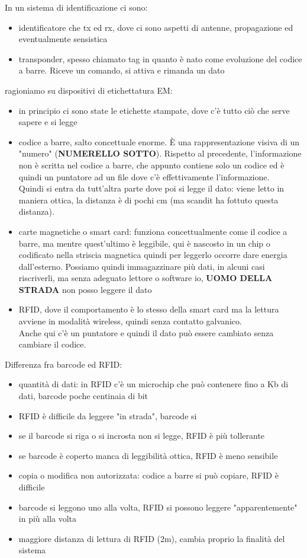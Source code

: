 \documentclass[oneside, 12pt]{extbook}
\begin{document}
In un sistema di identificazione ci sono:
\begin{itemize}
	\item identificatore che tx ed rx, dove ci sono aspetti di antenne, propagazione ed eventualmente sensistica
	\item transponder, spesso chiamato tag in quanto è nato come evoluzione del codice a barre. Riceve un comando, si attiva e rimanda un dato
\end{itemize}
ragioniamo su dispositivi di etichettatura EM: 
\begin{itemize}
	\item in principio ci sono state le etichette stampate, dove c'è tutto ciò che serve sapere e si legge
	\item codice a barre, salto concettuale enorme. È una rappresentazione visiva di un "numero" (\textbf{NUMERELLO SOTTO}). Rispetto al precedente, l'informazione non è scritta nel codice a barre, che appunto contiene solo un codice ed è quindi un puntatore ad un file dove c'è effettivamente l'informazione.\\Quindi si entra da tutt'altra parte dove poi si legge il dato: viene letto in maniera ottica, la distanza è di pochi cm (ma scandit ha fottuto questa distanza).
	\item carte magnetiche o smart card: funziona concettualmente come il codice a barre, ma mentre quest'ultimo è leggibile, qui è nascosto in un chip o codificato nella striscia magnetica quindi per leggerlo occorre dare energia dall'esterno. Possiamo quindi immagazzinare più dati, in alcuni casi riscriverli, ma senza adeguato lettore o software io, \textbf{UOMO DELLA STRADA} non posso leggere il dato
	\item RFID, dove il comportamento è lo stesso della smart card ma la lettura avviene in modalità wireless, quindi senza contatto galvanico.\\Anche qui c'è un puntatore e quindi il dato può essere cambiato senza cambiare il codice.
\end{itemize}
Differenza fra barcode ed RFID:
\begin{itemize}
	\item quantità di dati: in RFID c'è un microchip che può contenere fino a Kb di dati, barcode poche centinaia di bit
	\item RFID è difficile da leggere "in strada", barcode si
	\item se il barcode si riga o si incrosta non si legge, RFID è più tollerante
	\item se barcode è coperto manca di leggibilità ottica, RFID è meno sensibile
	\item copia o modifica non autorizzata: codice a barre si può copiare, RFID è difficile
	\item barcode si leggono uno alla volta, RFID si possono leggere "apparentemente" in più alla volta
	\item maggiore distanza di lettura di RFID (2m), cambia proprio la finalità del sistema
\end{itemize}
\end{document}

